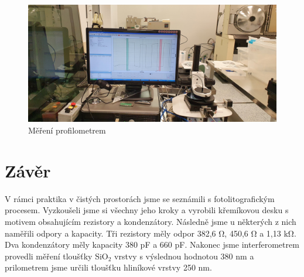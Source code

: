 \documentclass[a4paper,12pt]{article}
\begin{document}
\begin{figure}[h!]
	\centering
	\includegraphics[width=130mm]{10profilometr.jpg}
	\caption{Měření profilometrem}
	\label{10profilometr}
\end{figure}

\section{Závěr}
V rámci praktika v čistých prostorách jsme se seznámili s fotolitografickým procesem. Vyzkoušeli jsme si všechny jeho kroky a vyrobili křemíkovou desku s motivem obsahujícím rezistory a kondenzátory. Následně jsme u některých z nich naměřili odpory a kapacity. Tři rezistory měly odpor 382,6 \si{\ohm}, 450,6 \si{\ohm} a 1,13 \si{\kilo\ohm}. Dva kondenzátory měly kapacity 380 \si{\pico\farad} a 660 \si{\pico\farad}. Nakonec jsme interferometrem provedli měření tloušťky SiO$_2$ vrstvy s výslednou hodnotou 380 \si{\nano\meter} a prilometrem jsme určili tloušťku hliníkové vrstvy  250 \si{\nano\meter}.
\end{document}
